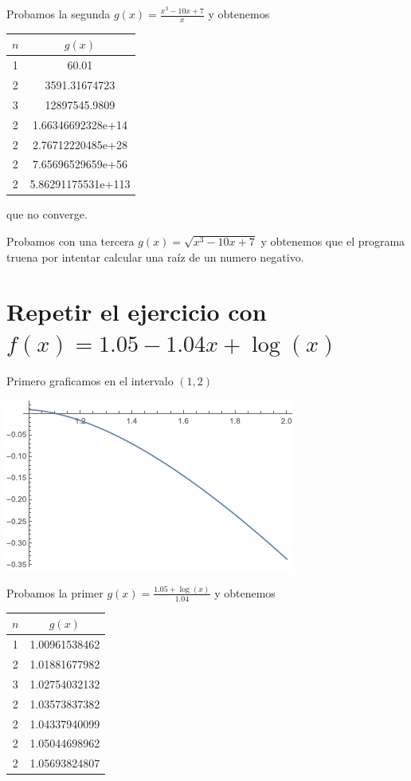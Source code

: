 \documentclass{article}
\begin{document}
Probamos la segunda $g(x)= \frac{x^3-10x+7}{x}$ y obtenemos
\begin{center}
    \begin{tabular}{||c c||} 
    \hline
    $n$ & $g(x)$\\ [0.5ex] 
    \hline
    1 & 60.01 \\
    \hline
    2 & 3591.31674723 \\
    \hline
    3 & 12897545.9809 \\ 
    \hline
    2 & 1.66346692328e+14 \\
    \hline
    2 & 2.76712220485e+28 \\
    \hline
    2 & 7.65696529659e+56 \\
    \hline
    2 & 5.86291175531e+113 \\ [1ex]
    \hline
   \end{tabular}
\end{center}
que no converge.

Probamos con una tercera $g(x) = \sqrt{x^3-10x+7}$ y obtenemos que el programa truena por intentar calcular una raíz de un numero negativo.

\section{Repetir el ejercicio con $f(x) = 1.05 - 1.04x +\log(x)$}
Primero graficamos en el intervalo $(1,2)$
\begin{center}
    \includegraphics[scale=0.75]{grafica3.png}
\end{center}

Probamos la primer $g(x)= \frac{1.05 + \log(x)}{1.04}$ y obtenemos

\begin{center}
    \begin{tabular}{||c c||} 
    \hline
    $n$ & $g(x)$\\ [0.5ex] 
    \hline
    1 & 1.00961538462 \\
    \hline
    2 & 1.01881677982 \\
    \hline
    3 & 1.02754032132 \\ 
    \hline
    2 & 1.03573837382 \\
    \hline
    2 & 1.04337940099 \\
    \hline
    2 & 1.05044698962 \\
    \hline
    2 & 1.05693824807 \\ [1ex]
    \hline
   \end{tabular}
\end{center}
\end{document}
